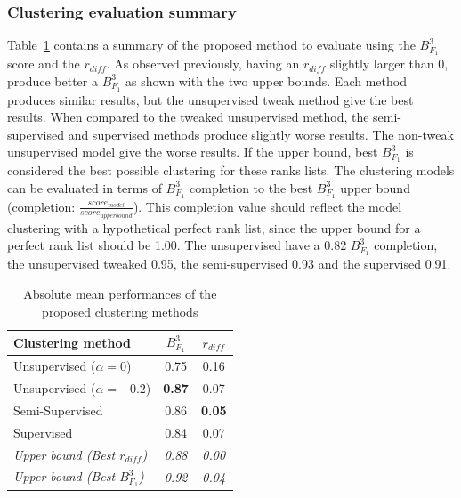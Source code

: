 \subsubsection{Clustering evaluation summary}

Table~\ref{tab:clustering_evaluation_summary} contains a summary of the proposed method to evaluate using the $B^3_{F_1}$ score and the $r_{diff}$.
As observed previously, having an $r_{diff}$ slightly larger than 0, produce better a $B^3_{F_1}$ as shown with the two upper bounds.
Each method produces similar results, but the unsupervised tweak method give the best results.
When compared to the tweaked unsupervised method, the semi-supervised and supervised methods produce slightly worse results.
The non-tweak unsupervised model give the worse results.
If the upper bound, best $B^3_{F_1}$ is considered the best possible clustering for these ranks lists.
The clustering models can be evaluated in terms of $B^3_{F_1}$ completion to the best $B^3_{F_1}$ upper bound (completion: $\frac{score_{model}}{score_{upper bound}}$).
This completion value should reflect the model clustering with a hypothetical perfect rank list, since the upper bound for a perfect rank list should be 1.00.
The unsupervised have a 0.82 $B^3_{F_1}$ completion, the unsupervised tweaked 0.95, the semi-supervised 0.93 and the supervised 0.91.

\begin{table}
  \centering
  \caption{Absolute mean performances of the proposed clustering methods}
  \label{tab:clustering_evaluation_summary}
  \begin{tabular}{l c c}
    \toprule
    Clustering method              & $B^3_{F_1}$ & $r_{diff}$ \\
    \midrule
    Unsupervised ($\alpha = 0$)    & 0.75 & 0.16 \\
    Unsupervised ($\alpha = -0.2$) & \textbf{0.87} & 0.07 \\
    Semi-Supervised                & 0.86 & \textbf{0.05} \\
    Supervised                     & 0.84 & 0.07 \\
    \midrule
    \textit{Upper bound (Best $r_{diff}$)}  & \textit{0.88} & \textit{0.00} \\
    \textit{Upper bound (Best $B^3_{F_1}$)} & \textit{0.92} & \textit{0.04} \\
    \bottomrule
  \end{tabular}
\end{table}
